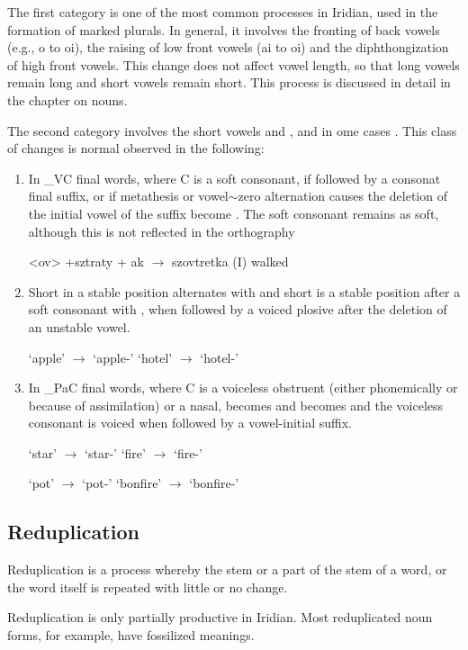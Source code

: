 The first category is one of the most common processes in Iridian, used in the formation of marked plurals. In general, it involves the fronting of back vowels (e.g., o to oi), the raising of low front vowels (ai to oi) and the diphthongization of high front vowels. This change does not affect vowel length, so that long vowels remain long and short vowels remain short. This process is discussed in detail in the chapter on nouns.

The second category involves the short vowels  and , and in ome cases . This class of changes is normal observed in the following:

\begin{enumerate}
	\item In \_VC final words, where C is a soft consonant, if followed by a consonat final suffix, or if metathesis or vowel$\sim$zero alternation causes the deletion of the initial vowel of the suffix  become . The soft consonant remains as soft, although this is not reflected in the orthography
	
		\pex
	\a <ov> +sztraty + ak $\rightarrow$ szovtretka (I) walked
	\xe
	\item Short  in a stable position alternates with  and short  is a stable position after a soft consonant with , when followed by a voiced plosive after the deletion of an unstable vowel.
	
	\pex
	\a {} `apple' $\rightarrow$  `apple-'
	\a {} `hotel' $\rightarrow$  `hotel-'
	\xe

	\item In \_PaC final words, where C is a voiceless obstruent (either phonemically or because of assimilation) or a nasal,  becomes  and  becomes  and the voiceless consonant is voiced when followed by a vowel-initial suffix.
	
		\pex
	\a {} `star' $\rightarrow$  `star-'
	\a {} `fire' $\rightarrow$  `fire-'
	\xe

	\pex
	\a {} `pot' $\rightarrow$  `pot-'
	\a {} `bonfire' $\rightarrow$  `bonfire-'
	\xe

\end{enumerate}



\subsection{Reduplication}
\par Reduplication is a process whereby the stem or a part of the stem of a word, or the word itself is repeated with little or no change. 
\par Reduplication is only partially productive in Iridian. Most reduplicated noun forms, for example, have fossilized meanings.


